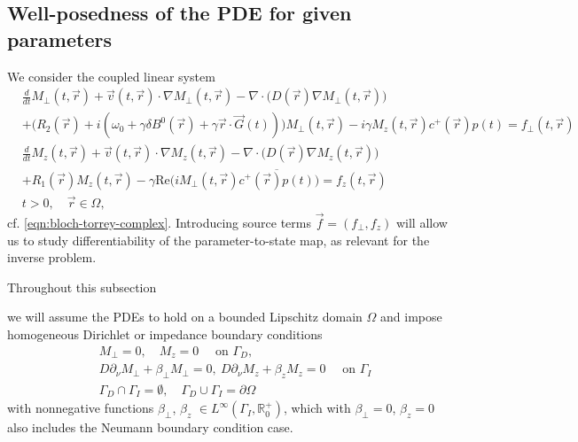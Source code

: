 \documentclass{ws-m3as}
\renewcommand\Re{\mathrm{Re}}
\newcommand{\revision}[1]{{ #1}}
\newcommand{\Margin}[1]{}
\begin{document}
\subsection{Well-posedness of the PDE for given parameters}\label{sec:wellposed}
We consider the coupled linear system
\begin{equation}\label{eqn:bloch-torrey-complex_f}
\begin{aligned}
&\frac{d}{dt}M_\perp(t, \vec r)+{\vec v}(t, \vec r)\cdot\nabla M_\perp(t, \vec r) -\nabla\cdot\bigl(D(\vec r) \nabla M_\perp(t, \vec r)\bigr) \\
&+\bigl(R_2(\vec r)+i(\omega_0 + \gamma\delta B^0(\vec r) + \gamma\vec r \cdot \vec G(t))
\bigr)M_\perp(t, \vec r)-i\gamma M_z(t, \vec r)c^+(\vec r)p(t)=f_\perp(t, \vec r)\\    
&\frac{d}{dt}M_z(t, \vec r)+{\vec v}(t, \vec r)\cdot\nabla M_z(t, \vec r) -\nabla\cdot\bigl(D(\vec r) \nabla M_z(t, \vec r)\bigr) \\
&+R_1(\vec r) M_z(t, \vec r)
-\gamma\Re\bigl(iM_\perp(t, \vec r)\overline{c^+(\vec r)p(t)}\bigr)=f_z(t, \vec r)
\\
&t>0, \quad \vec r\in\Omega,
\end{aligned}
\end{equation}
cf. \eqref{eqn:bloch-torrey-complex}.
Introducing source terms \revision{$\vec{f}=(f_\perp,f_z)$} will allow us to study differentiability of the parameter-to-state map, as relevant for the inverse problem.

Throughout this \revision{subsection} 
\Margin{R1 1.}
we will assume the PDEs to hold on a bounded Lipschitz domain $\Omega$ and impose  homogeneous Dirichlet or impedance boundary conditions
\begin{equation}\label{bc}
\begin{aligned}
&M_\perp=0, \quad M_z=0 \quad \text{ on }\Gamma_D, \\
&D\partial_\nu M_\perp+\beta_\perp M_\perp =0, \ 
D \partial_\nu M_z +\beta_z M_z =0 \quad \text{ on } \Gamma_I\\
&\Gamma_D\cap\Gamma_I=\emptyset, \quad \Gamma_D\cup\Gamma_I=\partial\Omega
\end{aligned}
\end{equation}
with nonnegative functions $\beta_\perp$, $\beta_z$ $\in L^\infty(\Gamma_I,\mathbb{R}_0^+)$, which with $\beta_\perp=0$, $\beta_z=0$ also includes the Neumann boundary condition case.
\end{document}
